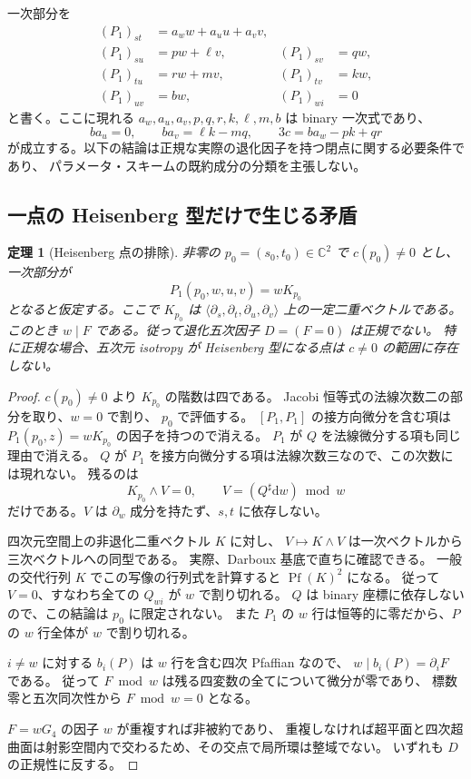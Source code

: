 \documentclass[11pt,a4paper]{ltjsarticle}
\newtheorem{theorem}{定理}[section]
\theoremstyle{remark}\newtheorem{remark}[theorem]{注意}
\begin{document}
一次部分を
\begin{align*}
 (P_1)_{st}&=a_w w+a_u u+a_v v,\\
 (P_1)_{su}&=p w+\ell v,& (P_1)_{sv}&=q w,\\
 (P_1)_{tu}&=r w+m v,& (P_1)_{tv}&=k w,\\
 (P_1)_{uv}&=b w,& (P_1)_{wi}&=0
\end{align*}
と書く。ここに現れる $a_w,a_u,a_v,p,q,r,k,\ell,m,b$ は binary 一次式であり、
\begin{equation}\label{eq:v18-leading}
 ba_u=0,\qquad ba_v=\ell k-mq,\qquad 3c=ba_w-pk+qr
\end{equation}
が成立する。以下の結論は正規な実際の退化因子を持つ閉点に関する必要条件であり、
パラメータ・スキームの既約成分の分類を主張しない。

\subsection{一点の Heisenberg 型だけで生じる矛盾}

\begin{theorem}[Heisenberg 点の排除]\label{thm:v18-heisenberg}
非零の $p_0=(s_0,t_0)\in\mathbb C^2$ で $c(p_0)\ne0$ とし、
一次部分が
\[
                       P_1(p_0,w,u,v)=wK_{p_0}
\]
となると仮定する。ここで $K_{p_0}$ は
$\langle\partial_s,\partial_t,\partial_u,\partial_v\rangle$
上の一定二重ベクトルである。
このとき $w\mid F$ である。従って退化五次因子 $D=(F=0)$ は正規でない。
特に正規な場合、五次元 isotropy が Heisenberg 型になる点は
$c\ne0$ の範囲に存在しない。
\end{theorem}

\begin{proof}
$c(p_0)\ne0$ より $K_{p_0}$ の階数は四である。
Jacobi 恒等式の法線次数二の部分を取り、$w=0$ で割り、
$p_0$ で評価する。
$[P_1,P_1]$ の接方向微分を含む項は $P_1(p_0,z)=wK_{p_0}$ の因子を持つので消える。
$P_1$ が $Q$ を法線微分する項も同じ理由で消える。
$Q$ が $P_1$ を接方向微分する項は法線次数三なので、この次数には現れない。
残るのは
\[
                    K_{p_0}\wedge V=0,\qquad
                    V=(Q^\sharp\mathrm dw)\bmod w
\]
だけである。$V$ は $\partial_w$ 成分を持たず、$s,t$ に依存しない。

四次元空間上の非退化二重ベクトル $K$ に対し、
$V\mapsto K\wedge V$ は一次ベクトルから三次ベクトルへの同型である。
実際、Darboux 基底で直ちに確認できる。
一般の交代行列 $K$ でこの写像の行列式を計算すると $\operatorname{Pf}(K)^2$ になる。
従って $V=0$、すなわち全ての $Q_{wi}$ が $w$ で割り切れる。
$Q$ は binary 座標に依存しないので、この結論は $p_0$ に限定されない。
また $P_1$ の $w$ 行は恒等的に零だから、$P$ の $w$ 行全体が $w$ で割り切れる。

$i\ne w$ に対する $b_i(P)$ は $w$ 行を含む四次 Pfaffian なので、
$w\mid b_i(P)=\partial_iF$ である。
従って $F\bmod w$ は残る四変数の全てについて微分が零であり、
標数零と五次同次性から $F\bmod w=0$ となる。

$F=wG_4$ の因子 $w$ が重複すれば非被約であり、
重複しなければ超平面と四次超曲面は射影空間内で交わるため、その交点で局所環は整域でない。
いずれも $D$ の正規性に反する。
\end{proof}
\end{document}
